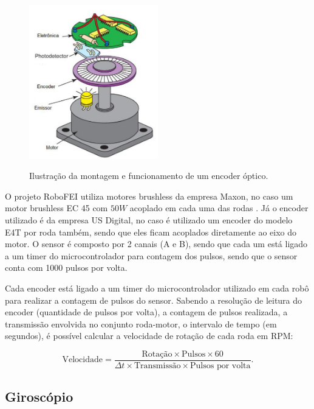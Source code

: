 \documentclass[acronym, symbols, table, deposito]{fei}
\begin{document}
				\begin{figure}[!htb]
					\centering
					\caption{Ilustração da montagem e funcionamento de um encoder óptico.} 
					\includegraphics[width=0.5\textwidth]{encoder_optico.png}
					\label{fig:optical_encoder}
				\end{figure}
				
				O projeto RoboFEI utiliza motores brushless da empresa Maxon\textregistered, no caso um motor brushless EC 45 com $50W$ acoplado em cada uma das rodas \cite{ec45_maxon}. Já o encoder utilizado é da empresa US Digital\textregistered \cite{e4t_encoder}, no caso é utilizado um encoder do modelo E4T por roda também, sendo que eles ficam acoplados diretamente ao eixo do motor. O sensor é composto por 2 canais (A e B), sendo que cada um está ligado a um timer do microcontrolador para contagem dos pulsos, sendo que o sensor conta com 1000 pulsos por volta.
				
				Cada encoder está ligado a um timer do microcontrolador utilizado em cada robô para realizar a contagem de pulsos do sensor. Sabendo a resolução de leitura do encoder (quantidade de pulsos por volta), a contagem de pulsos realizada, a transmissão envolvida no conjunto roda-motor, o intervalo de tempo (em segundos), é possível calcular a velocidade de rotação de cada roda em RPM:
				
				\begin{equation}\label{eq:velocidade_roda_encoder}
						\text{Velocidade} = \frac{\text{Rotação} \times \text{Pulsos} \times 60}{\Delta t \times \text{Transmissão} \times \text{Pulsos por volta}}.
				\end{equation}
			
			\subsection{Giroscópio} \label{sec:sensores_giroscopio}
			
\end{document}
